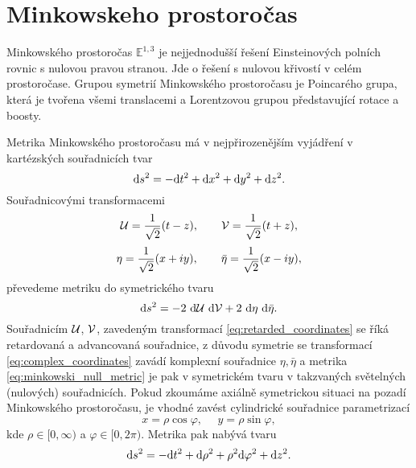 \section{Minkowskeho prostoročas}
Minkowského prostoročas $\mathbb{E}^{1,3}$ je nejjednodušší řešení Einsteinových polních rovnic s nulovou pravou stranou.
Jde o řešení s nulovou křivostí v celém prostoročase. Grupou symetrií Minkowského prostoročasu je Poincarého
grupa, která je tvořena všemi translacemi a Lorentzovou grupou představující rotace a boosty.

Metrika Minkowského prostoročasu má v nejpřirozenějším vyjádření v kartézských souřadnicích tvar
\begin{equation}
     \label{eq:minkowski}
     \mathrm{d} s^2 = - \mathrm{d} t^2 + \mathrm{d} x^2 + \mathrm{d} y^2 + \mathrm{d} z^2.
\end{equation}
Souřadnicovými transformacemi
\begin{equation}
     \label{eq:retarded_coordinates}
     \mathcal{U} = \frac{1}{\sqrt{2}} (t - z),~~~~~~\mathcal{V} = \frac{1}{\sqrt{2}} (t + z),
\end{equation}
\begin{equation}
     \label{eq:complex_coordinates}
     \eta = \frac{1}{\sqrt{2}} (x + iy), ~~~~~~\bar{\eta} = \frac{1}{\sqrt{2}} (x - iy),
\end{equation}
převedeme metriku do symetrického tvaru
\begin{equation}
     \label{eq:minkowski_null_metric}
     \mathrm{d} s^2 = -2 ~ \mathrm{d} \mathcal{U} ~ \mathrm{d} \mathcal{V} + 2 ~ \mathrm{d} \eta ~ \mathrm{d} \bar{\eta}.
\end{equation}
Souřadnicím $\mathcal{U}$, $\mathcal{V}$, zavedeným transformací \eqref{eq:retarded_coordinates} se říká retardovaná a advancovaná souřadnice,
z důvodu symetrie se transformací \eqref{eq:complex_coordinates} zavádí komplexní souřadnice $\eta, \bar{\eta}$ a
metrika \eqref{eq:minkowski_null_metric} je pak v symetrickém tvaru v takzvaných světelných (nulových) souřadnicích.
Pokud zkoumáme axiálně symetrickou situaci na pozadí Minkowského prostoročasu, je vhodné zavést cylindrické
souřadnice parametrizací
\begin{equation}
     x = \rho \cos \varphi, ~~~~~~ y = \rho \sin \varphi,
\end{equation}
kde $\rho \in [0, \infty)$ a $\varphi \in [0, 2\pi)$. Metrika pak nabývá tvaru
\begin{equation}
     \mathrm{d} s^2 = -\mathrm{d} t^2 + \mathrm{d} \rho^2 + \rho^2 \mathrm{d} \varphi^2 + \mathrm{d} z^2.
\end{equation}

